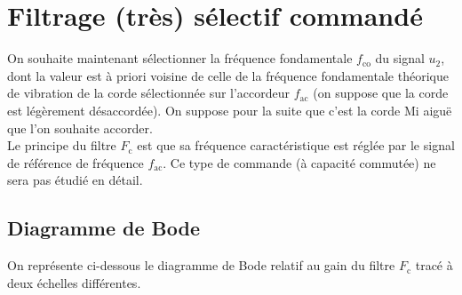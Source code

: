 \documentclass[a4paper,french,bookmarks]{article}
\begin{document}
\begin{enumerate}[resume]
\end{enumerate}



\section{Filtrage (très) sélectif commandé}

On souhaite maintenant sélectionner la fréquence fondamentale $f_\text{co}$
du signal $u_2$, dont la valeur est à priori voisine de celle de la fréquence fondamentale
théorique de vibration de la corde sélectionnée sur l'accordeur $f_\text{ac}$ (on
suppose que la corde est légèrement désaccordée). On suppose pour la
suite que c'est la corde Mi aiguë que l'on souhaite accorder.\\[-10pt]

Le principe du filtre $F_\text{c}$ est que sa fréquence caractéristique est
réglée par le signal de référence de fréquence $f_\text{ac}$. Ce type de commande (à
capacité commutée) ne sera pas étudié en détail.

\subsection{Diagramme de Bode}


On représente ci-dessous le diagramme de Bode relatif au gain du
filtre $F_\text{c}$ tracé à deux échelles différentes.
\end{document}

